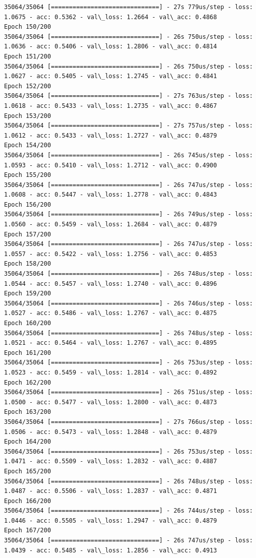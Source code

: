 \documentclass[11pt]{article}
\begin{document}
\begin{Verbatim}[commandchars=\\\{\}]
35064/35064 [==============================] - 27s 779us/step - loss: 1.0675 - acc: 0.5362 - val\_loss: 1.2664 - val\_acc: 0.4868
Epoch 150/200
35064/35064 [==============================] - 26s 750us/step - loss: 1.0636 - acc: 0.5406 - val\_loss: 1.2806 - val\_acc: 0.4814
Epoch 151/200
35064/35064 [==============================] - 26s 750us/step - loss: 1.0627 - acc: 0.5405 - val\_loss: 1.2745 - val\_acc: 0.4841
Epoch 152/200
35064/35064 [==============================] - 27s 763us/step - loss: 1.0618 - acc: 0.5433 - val\_loss: 1.2735 - val\_acc: 0.4867
Epoch 153/200
35064/35064 [==============================] - 27s 757us/step - loss: 1.0612 - acc: 0.5433 - val\_loss: 1.2727 - val\_acc: 0.4879
Epoch 154/200
35064/35064 [==============================] - 26s 745us/step - loss: 1.0593 - acc: 0.5410 - val\_loss: 1.2712 - val\_acc: 0.4900
Epoch 155/200
35064/35064 [==============================] - 26s 747us/step - loss: 1.0608 - acc: 0.5447 - val\_loss: 1.2778 - val\_acc: 0.4843
Epoch 156/200
35064/35064 [==============================] - 26s 749us/step - loss: 1.0560 - acc: 0.5459 - val\_loss: 1.2684 - val\_acc: 0.4879
Epoch 157/200
35064/35064 [==============================] - 26s 747us/step - loss: 1.0557 - acc: 0.5422 - val\_loss: 1.2756 - val\_acc: 0.4853
Epoch 158/200
35064/35064 [==============================] - 26s 748us/step - loss: 1.0544 - acc: 0.5457 - val\_loss: 1.2740 - val\_acc: 0.4896
Epoch 159/200
35064/35064 [==============================] - 26s 746us/step - loss: 1.0527 - acc: 0.5486 - val\_loss: 1.2767 - val\_acc: 0.4875
Epoch 160/200
35064/35064 [==============================] - 26s 748us/step - loss: 1.0521 - acc: 0.5464 - val\_loss: 1.2767 - val\_acc: 0.4895
Epoch 161/200
35064/35064 [==============================] - 26s 753us/step - loss: 1.0523 - acc: 0.5459 - val\_loss: 1.2814 - val\_acc: 0.4892
Epoch 162/200
35064/35064 [==============================] - 26s 751us/step - loss: 1.0500 - acc: 0.5477 - val\_loss: 1.2800 - val\_acc: 0.4873
Epoch 163/200
35064/35064 [==============================] - 27s 766us/step - loss: 1.0506 - acc: 0.5473 - val\_loss: 1.2848 - val\_acc: 0.4879
Epoch 164/200
35064/35064 [==============================] - 26s 753us/step - loss: 1.0471 - acc: 0.5509 - val\_loss: 1.2832 - val\_acc: 0.4887
Epoch 165/200
35064/35064 [==============================] - 26s 748us/step - loss: 1.0487 - acc: 0.5506 - val\_loss: 1.2837 - val\_acc: 0.4871
Epoch 166/200
35064/35064 [==============================] - 26s 744us/step - loss: 1.0446 - acc: 0.5505 - val\_loss: 1.2947 - val\_acc: 0.4879
Epoch 167/200
35064/35064 [==============================] - 26s 747us/step - loss: 1.0439 - acc: 0.5485 - val\_loss: 1.2856 - val\_acc: 0.4913

\end{Verbatim}
\end{document}
